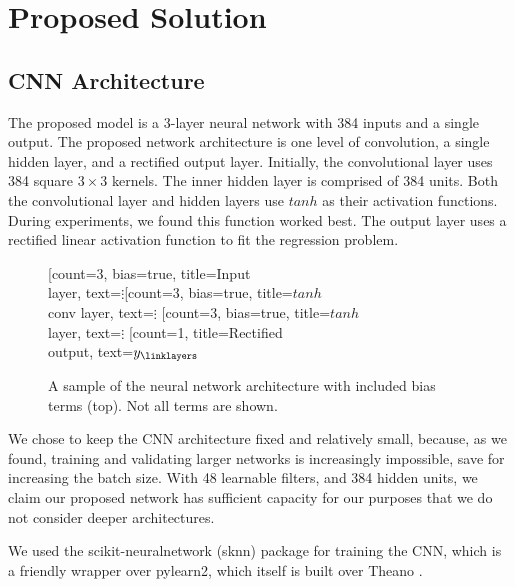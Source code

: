\documentclass{article}
\begin{document}
\section{Proposed Solution}

\subsection{CNN Architecture}

The proposed model is a 3-layer neural network with 384 inputs and a single output.  The proposed network architecture is one level of convolution, a single hidden layer, and a rectified output layer.  Initially, the convolutional layer uses 384 square $3\times3$ kernels.  The inner hidden layer is comprised of 384 units.  Both the convolutional layer and hidden layers use $tanh$ as their activation functions.  During experiments, we found this function worked best.  The output layer uses a rectified linear activation function to fit the regression problem.

\begin{figure}[ht]
\centering
\begin{neuralnetwork}[height=4]
	\newcommand{\nodetexty}[2]{$y_#2$}
	\newcommand{\mynodetext}[2]{$\vdots$}
	\setdefaultnodetext{\mynodetext}
	[count=3, bias=true, title=Input\\layer, text=\mynodetext]
	\hiddenlayer[count=3, bias=true, title=$tanh$\\conv layer, text=\mynodetext] \linklayers
	\hiddenlayer[count=3, bias=true, title=$tanh$\\layer, text=\mynodetext] \linklayers
	\outputlayer[count=1, title=Rectified\\output, text=\nodetexty] \linklayers
\end{neuralnetwork}
\caption{A sample of the neural network architecture with included bias terms (top).  Not all terms are shown.}
\end{figure}

We chose to keep the CNN architecture fixed and relatively small, because, as we found, training and validating larger networks is increasingly impossible, save for increasing the batch size.  With 48 learnable filters, and 384 hidden units, we claim our proposed network has sufficient capacity for our purposes that we do not consider deeper architectures.

We used the scikit-neuralnetwork (sknn) package for training the CNN, which is a friendly wrapper over pylearn2, which itself is built over Theano \cite{theano}.
\end{document}
